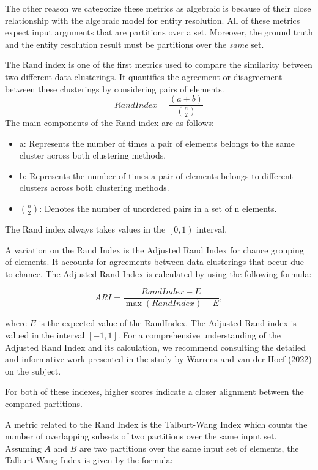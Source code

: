 \documentclass[a4paper,twoside]{article}
\begin{document}
    The other reason we categorize these metrics as algebraic is because of
    their close relationship with the algebraic model for entity resolution.
    All of these metrics expect input arguments that are partitions over a set.
    Moreover, the ground truth and the entity resolution result must be
    partitions over the \textit{same} set.
    
    The Rand index is one of the first metrics used to compare the similarity
    between two different data clusterings.
    It quantifies the agreement or disagreement between these clusterings by
    considering pairs of elements.
        \[ Rand Index = \frac{(a + b)}{{\binom{n}{2}}} \]
    The main components of the Rand index are as follows:
    \begin{itemize}
    \item a: Represents the number of times a pair of elements belongs to the
        same cluster across both clustering methods.
    \item b: Represents the number of times a pair of elements belongs to
        different clusters across both clustering methods.
    \item $\binom{n}{2}$: Denotes the number of unordered pairs in a set of n
        elements.
    \end{itemize}
    
    The Rand index always takes values in the $\left[0, 1\right)$ interval.

    A variation on the Rand Index is the Adjusted Rand Index for chance grouping
    of elements.
    It accounts for agreements between data clusterings that occur due to
    chance\cite{adjrand2001}.
    The Adjusted Rand Index is calculated by using the following formula:
    
    \[ ARI = \frac{RandIndex - E}{\max(RandIndex) - E}, \]

    where $E$ is the expected value of the RandIndex.
    The Adjusted Rand index is valued in the interval $\left[-1, 1\right]$.
    For a comprehensive understanding of the Adjusted Rand Index and its
    calculation, we recommend consulting the detailed and informative work
    presented in the study by Warrens and van der Hoef (2022) on the
    subject\cite{warrens2022understanding}.

    For both of these indexes, higher scores indicate a closer alignment between
    the compared partitions.

    A metric related to the Rand Index is the Talburt-Wang Index which counts
    the number of overlapping subsets of two partitions over the same input set.
    Assuming $A$ and $B$ are two partitions over the same input set of elements,
    the Talburt-Wang Index is given by the formula:
\end{document}
